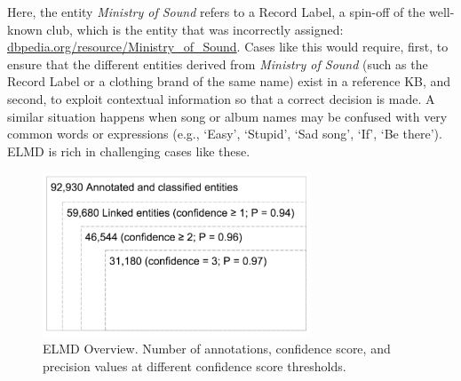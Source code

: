 Here, the entity \textit{Ministry of Sound} refers to a Record Label, a spin-off of the well-known club, which is the entity that was incorrectly assigned: \url{dbpedia.org/resource/Ministry\_of\_Sound}. 
Cases like this would require, first, to ensure that the different entities derived from \textit{Ministry of Sound} (such as the Record Label or a clothing brand of the same name) exist in a reference KB, and second, to exploit contextual information so that a correct decision is made.
A similar situation happens when song or album names may be confused with very common words or expressions (e.g., `Easy', `Stupid', `Sad song', `If', `Be there'). \textsc{ELMD} is rich in challenging cases like these.






\begin{figure}[h!]
  \centering
	\includegraphics[width=8cm]{ch03_linking_pics/ELMD_Overview_bn.pdf}
  \caption{ELMD Overview. Number of annotations, confidence score, and precision values at different confidence score thresholds.}
  \label{fig:linking:elmd}
\end{figure}

